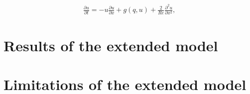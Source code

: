 \documentclass{article}
\begin{document}
\begin{align}
\frac{\partial u}{\partial t}=-u\frac{\partial u}{\partial x} + g\left(q,u \right) + \frac{2}{Re}\frac{\partial^{2} u}{\partial x^{2}} \text{,}
\label{eq:PDE_u}
\end{align}






\section{Results of the extended model}




\section{Limitations of the extended model}










\end{document}
